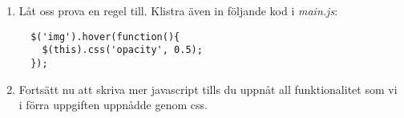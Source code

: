 \documentclass{article}
\begin{document}
\begin{enumerate}
        \item Låt oss prova en regel till. Klistra även in följande kod i \emph{main.js}:
        \begin{lstlisting}
  $('img').hover(function(){
    $(this).css('opacity', 0.5);
  });
        \end{lstlisting}
        \item Fortsätt nu att skriva mer javascript tills du uppnåt all funktionalitet som vi i förra uppgiften uppnådde genom css.
      \end{enumerate}








 
\end{document}
